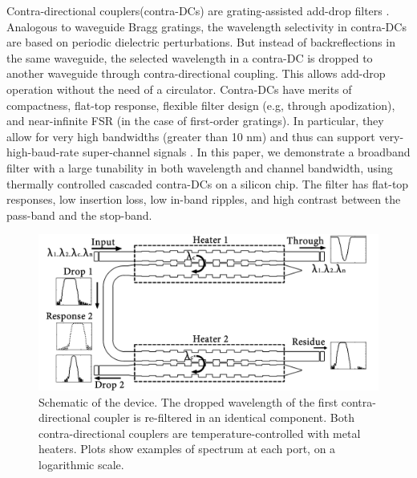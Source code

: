 \documentclass[osajnl,twocolumn,showpacs,superscriptaddress,10pt]{revtex4-1}
\begin{document}
Contra-directional couplers(contra-DCs) are grating-assisted add-drop filters \cite{shi2013siliconContraDC}. 
Analogous to waveguide Bragg gratings, the wavelength selectivity in contra-DCs are based on periodic dielectric perturbations. But instead of backreflections in the same waveguide, the selected wavelength in a contra-DC is dropped to another waveguide through contra-directional coupling.
This allows add-drop operation without the need of a circulator. 
Contra-DCs have merits of compactness, flat-top response, flexible filter design (e.g, through apodization), and near-infinite FSR (in the case of first-order gratings).
In particular, they allow for very high bandwidths (greater than 10 nm) and thus can support very-high-baud-rate super-channel signals \cite{jinno2009spectrum}.
In this paper, we demonstrate a broadband filter with a large tunability in both wavelength and channel bandwidth, using thermally controlled cascaded contra-DCs on a silicon chip. 
The filter has flat-top responses, low insertion loss, low in-band ripples, and high contrast between the pass-band and the stop-band.

\begin{figure}[htbp]
	\centering
	\includegraphics[width=1.00\columnwidth]{data/CascadedSchematic2}
	\centering
	\caption{Schematic of the device. 
	The dropped wavelength of the first contra-directional coupler is re-filtered in an identical component. 
	Both contra-directional couplers are temperature-controlled with metal heaters. 
	Plots show examples of spectrum at each port, on a logarithmic scale.}
	\label{fig:schematic}
\end{figure}
\end{document}
